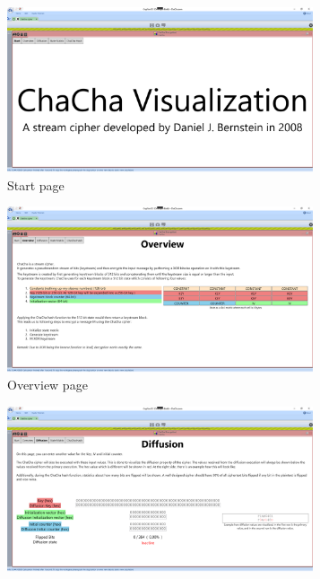 \begin{figure}
\caption[All pages of the ChaCha visualization plugin]{All pages of the ChaCha visualization plugin in their initial state}
\label{fig:allpages}
\centering
\begin{subfigure}{.5\textwidth}
  \centering
  \includegraphics[width=0.99\textwidth]{figures/ct2/all-pages/1-start.png}
  \caption{Start page}
\end{subfigure}%
\begin{subfigure}{.5\textwidth}
  \centering
  \includegraphics[width=0.99\textwidth]{figures/ct2/all-pages/2-overview.png}
  \caption{Overview page}
\end{subfigure}
\begin{subfigure}{.5\textwidth}
  \centering
  \includegraphics[width=0.99\textwidth]{figures/ct2/all-pages/3-diffusion.png}

\end{subfigure}
\end{figure}

